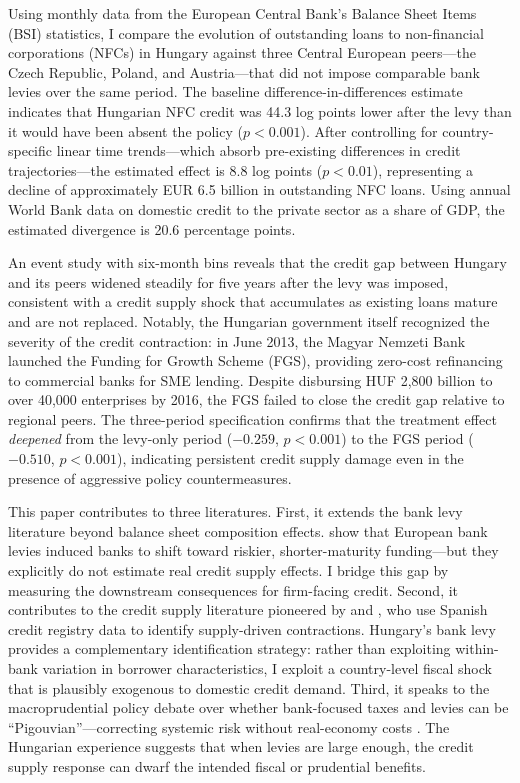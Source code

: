 \documentclass[12pt]{article}
\begin{document}
Using monthly data from the European Central Bank's Balance Sheet Items (BSI) statistics, I compare the evolution of outstanding loans to non-financial corporations (NFCs) in Hungary against three Central European peers---the Czech Republic, Poland, and Austria---that did not impose comparable bank levies over the same period. The baseline difference-in-differences estimate indicates that Hungarian NFC credit was 44.3 log points lower after the levy than it would have been absent the policy ($p < 0.001$). After controlling for country-specific linear time trends---which absorb pre-existing differences in credit trajectories---the estimated effect is 8.8 log points ($p < 0.01$), representing a decline of approximately EUR 6.5 billion in outstanding NFC loans. Using annual World Bank data on domestic credit to the private sector as a share of GDP, the estimated divergence is 20.6 percentage points.

An event study with six-month bins reveals that the credit gap between Hungary and its peers widened steadily for five years after the levy was imposed, consistent with a credit supply shock that accumulates as existing loans mature and are not replaced. Notably, the Hungarian government itself recognized the severity of the credit contraction: in June 2013, the Magyar Nemzeti Bank launched the Funding for Growth Scheme (FGS), providing zero-cost refinancing to commercial banks for SME lending. Despite disbursing HUF 2,800 billion to over 40,000 enterprises by 2016, the FGS failed to close the credit gap relative to regional peers. The three-period specification confirms that the treatment effect \textit{deepened} from the levy-only period ($-0.259$, $p < 0.001$) to the FGS period ($-0.510$, $p < 0.001$), indicating persistent credit supply damage even in the presence of aggressive policy countermeasures.

This paper contributes to three literatures. First, it extends the bank levy literature beyond balance sheet composition effects. \citet{devereux2019} show that European bank levies induced banks to shift toward riskier, shorter-maturity funding---but they explicitly do not estimate real credit supply effects. I bridge this gap by measuring the downstream consequences for firm-facing credit. Second, it contributes to the credit supply literature pioneered by \citet{jimenez2012} and \citet{jimenez2014}, who use Spanish credit registry data to identify supply-driven contractions. Hungary's bank levy provides a complementary identification strategy: rather than exploiting within-bank variation in borrower characteristics, I exploit a country-level fiscal shock that is plausibly exogenous to domestic credit demand. Third, it speaks to the macroprudential policy debate over whether bank-focused taxes and levies can be ``Pigouvian''---correcting systemic risk without real-economy costs \citep{acharya2017}. The Hungarian experience suggests that when levies are large enough, the credit supply response can dwarf the intended fiscal or prudential benefits.
\end{document}
